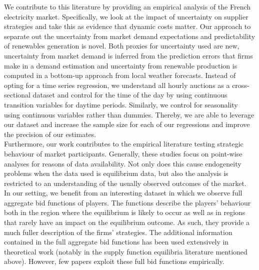 We contribute to this literature by providing an empirical analysis of the French electricity market. Specifically, we look at the impact of uncertainty on supplier strategies and take this as evidence that dynamic costs matter. Our approach to separate out the uncertainty from market demand expectations and predictability of renewables generation is novel. Both proxies for uncertainty used are new, uncertainty from market demand is inferred from the prediction errors that firms make in a demand estimation and uncertainty from renewable production is computed in a bottom-up approach from local weather forecasts. Instead of opting for a time series regression, we understand all hourly auctions as a cross-sectional dataset and control for the time of the day by using continuous transition variables for daytime periods. Similarly, we control for seasonality using continuous variables rather than dummies. Thereby, we are able to leverage our dataset and increase the sample size for each of our regressions and improve the precision of our estimates. \\

Furthermore, our work contributes to the empirical literature testing strategic behaviour of market participants. Generally, these studies focus on point-wise analyses for reasons of data availability. Not only does this cause endogeneity problems when the data used is equilibrium data, but also the analysis is restricted to an understanding of the usually observed outcomes of the market. \\
 
In our setting, we benefit from an interesting dataset in which we observe full aggregate bid functions of players. The functions describe the players' behaviour both in the region where the equilibrium is likely to occur as well as in regions that rarely have an impact on the equilibrium outcome. As such, they provide a much fuller description of the firms' strategies. The additional information contained in the full aggregate bid functions has been used extensively in theoretical work (notably in the supply function equilibria literature mentioned above). However, few papers exploit these full bid functions empirically. \\


